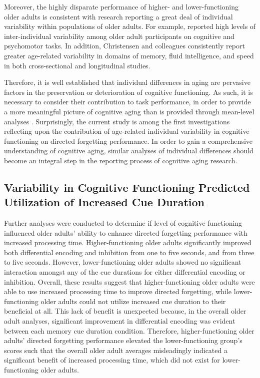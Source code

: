 \documentclass[man]{apa6}
\begin{document}
Moreover, the highly disparate performance of higher- and lower-functioning older adults is consistent with research reporting a great deal of individual variability within populations of older adults. For example, \textcite{shammi.bosman.stuss1998} reported high levels of inter-individual variability among older adult participants on cognitive and psychomotor tasks. In addition, Christensen and colleagues \parencite{christensen.et.al1994,christensen.et.al1999,christensen2001} consistently report greater age-related variability in domains of memory, fluid intelligence, and speed in both cross-sectional and longitudinal studies.

Therefore, it is well established that individual differences in aging are pervasive factors in the preservation or deterioration of cognitive functioning. As such, it is necessary to consider their contribution to task performance, in order to provide a more meaningful picture of cognitive aging than is provided through mean-level analyses \parencite{nelson.dannefer1992}. Surprisingly, the current study is among the first investigations reflecting upon the contribution of age-related individual variability in cognitive functioning on directed forgetting performance. In order to gain a comprehensive understanding of cognitive aging, similar analyses of individual differences should become an integral step in the reporting process of cognitive aging research.

\subsection*{Variability in Cognitive Functioning Predicted Utilization of Increased Cue Duration}

Further analyses were conducted to determine if level of cognitive functioning influenced older adults’ ability to enhance directed forgetting performance with increased processing time. Higher-functioning older adults significantly improved both differential encoding and inhibition from one to five seconds, and from three to five seconds. However, lower-functioning older adults showed no significant interaction amongst any of the cue durations for either differential encoding or inhibition. Overall, these results suggest that higher-functioning older adults were able to use increased processing time to improve directed forgetting, while lower-functioning older adults could not utilize increased cue duration to their beneficial at all. This lack of benefit is unexpected because, in the overall older adult analyses, significant improvement in differential encoding was evident between each memory cue duration condition. Therefore, higher-functioning older adults’ directed forgetting performance elevated the lower-functioning group’s scores such that the overall older adult averages misleadingly indicated a significant benefit of increased processing time, which did not exist for lower-functioning older adults.
\end{document}
